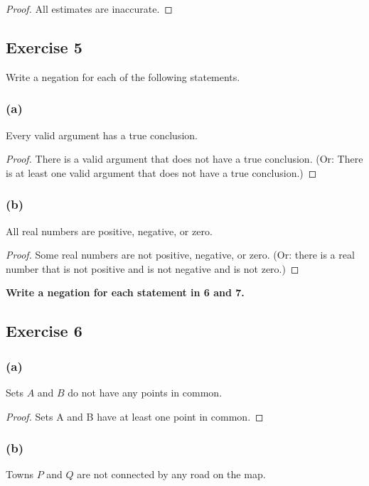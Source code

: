 \documentclass[14pt]{extarticle}
\begin{document}
\begin{proof}
All estimates are inaccurate.
\end{proof}

\subsection{Exercise 5}
Write a negation for each of the following statements.

\subsubsection{(a)}
Every valid argument has a true conclusion.

\begin{proof}
There is a valid argument that does not have a true
conclusion. (Or: There is at least one valid argument
that does not have a true conclusion.)
\end{proof}

\subsubsection{(b)}
All real numbers are positive, negative, or zero.

\begin{proof}
Some real numbers are not positive, negative, or zero. (Or: there is a real number that is not positive and is not negative and is not zero.)
\end{proof}

{\bf \color{cyan}Write a negation for each statement in 6 and 7.}

\subsection{Exercise 6}

\subsubsection{(a)}
Sets $A$ and $B$ do not have any points in common.

\begin{proof}
Sets A and B have at least one point in common.
\end{proof}

\subsubsection{(b)}
Towns $P$ and $Q$ are not connected by any road on the map.
\end{document}
